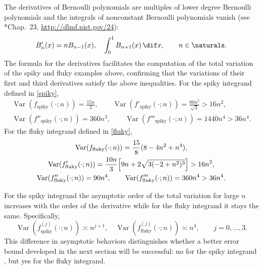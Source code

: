 \documentclass[]{amsart}
\DeclareMathOperator{\Var}{Var}
\theoremstyle{definition}
\theoremstyle{remark}
\begin{document}
The derivatives of Bernoulli polynomials are multiples of lower degree Bernoulli polynomials and the integrals of nonconstant Bernoulli polynomials vanish (see *{Chap.\ 23, \url{http://dlmf.nist.gov/24}}):
\[
B'_n(x) = n B_{n-1}(x), \quad \int_0^1 B_{n+1}(x) \, \dif x, \qquad n \in \naturals.
\]
The formula for the derivatives facilitates the computation of the total variation of the spiky and fluky examples above, confirming that the variations of their first and third derivatives satisfy the above inequalities.  For the spiky integrand defined in \eqref{spiky},
\begin{subequations} \label{spikyvariation}
\begin{gather}
\Var(f_{\text{spiky}}(\cdot;n))= \frac{15n}{2}, \qquad  \Var(f'_{\text{spiky}}(\cdot;n))= \frac{80n^2}{\sqrt{3}} > 16 n^2, \\
\Var(f''_{\text{spiky}}(\cdot;n))= 360n^3, \qquad \Var(f'''_{\text{spiky}}(\cdot;n))= 1440n^4 > 36n^4.
\end{gather}
\end{subequations} 
For the fluky integrand defined in \eqref{fluky},
\begin{subequations} \label{spikyvariation}
\begin{gather}
\Var(f_{\text{fluky}}(\cdot;n))= \frac{15}{8} (8 - 4 n^2 + n^4),  \\
\Var(f'_{\text{fluky}}(\cdot;n))= \frac{10 n}{3}  \Bigl[9 n + 2 \sqrt{3(-2 + n^2)^3} \Bigr ]  > 16 n^2, \\
\Var(f''_{\text{fluky}}(\cdot;n))= 90n^4, \qquad \Var(f'''_{\text{fluky}}(\cdot;n))= 360n^4 > 36n^4.
\end{gather}
\end{subequations}  

For the spiky integrand the asymptotic order of the total variation for large $n$ increases with the order of the derivative while for the fluky integrand it stays the same.  Specifically,
\[
\Var(f^{(j)}_{\text{spiky}}(\cdot;n)) \asymp n^{j+1}, \quad \Var(f^{(j)}_{\text{fluky}}(\cdot;n)) \asymp n^{4}, \qquad j=0, \ldots, 3.
\]
This difference in asymptotic behaviors distinguishes whether a better error bound developed in the next section will be successful:  no for the spiky integrand , but yes for the fluky integrand.
\end{document}
